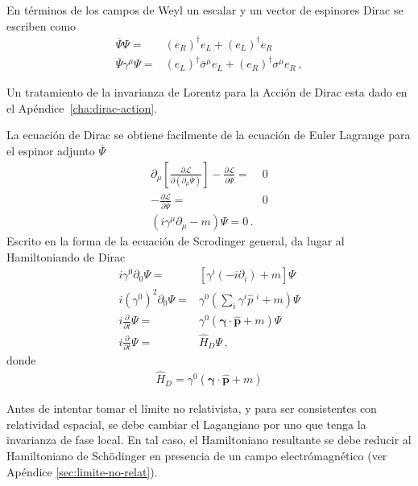En términos de los campos de Weyl un escalar y un vector de espinores Dirac se escriben como
\begin{align}
\label{eq:mwd}
  \overline{\Psi}\Psi =& \left( e_R \right)^\dagger e_L+\left( e_L \right)^{\dagger}e_R \nonumber\\
  \overline{\Psi}\gamma^{\mu}\Psi=& (e_L)^{\dagger}\overline{\sigma}^{\mu}e_L+(e_R)^{\dagger}\sigma^{\mu}e_{R}\,,
\end{align}


Un tratamiento de la invarianza de Lorentz para la Acción de Dirac esta dado en el Apéndice~\ref{cha:dirac-action}. 

\begin{frame}
La ecuación de Dirac se obtiene facilmente de la ecuación de Euler Lagrange para el espinor adjunto $\overline{\Psi}$
\begin{align}
  \partial_{\mu}\left[ \frac{\partial\mathcal{L}}{\partial \left( \partial_{\mu} \overline{\Psi} \right)} \right]-\frac{\partial \mathcal{L}}{\partial \overline{\Psi}}=&0 \nonumber\\
-\frac{\partial \mathcal{L}}{\partial \overline{\Psi}}=&0 \nonumber\\
\left( i\gamma^{\mu}\partial_{\mu}-m \right)\Psi=0\,.
\end{align}
Escrito en la forma de la ecuación de Scrodinger general, da lugar al Hamiltoniando de Dirac
\begin{align}
  i\gamma^0 \partial_{0}\Psi=&\left[ \gamma^{i} \left( -i \partial_{i}\right)+m \right]\Psi \nonumber\\
  i \left( \gamma^0 \right)^2 \partial_{0}\Psi=&\gamma^0\left( \sum_i\gamma^{i} \widehat{p}\;^i +m \right)\Psi \nonumber\\
  i \frac{\partial}{\partial t}\Psi=&\gamma^0\left( \boldsymbol{\gamma}\cdot \widehat{\boldsymbol{p}} +m \right)\Psi \nonumber\\
  i \frac{\partial}{\partial t}\Psi=&\widehat{H}_D\Psi\,,
\end{align}
donde
\begin{align}
  \widehat{H}_D=\gamma^0\left( \boldsymbol{\gamma}\cdot \widehat{\boldsymbol{p}} +m \right)
\end{align}
\end{frame}
Antes de intentar tomar el límite no relativista, y para ser consistentes con relatividad espacial, se debe cambiar el Lagangiano por uno que tenga la invarianza de fase local. En tal caso, el Hamiltoniano resultante se debe reducir al Hamiltoniano de  Sch\"odinger en presencia de un campo electrómagnético (ver Apéndice \ref{sec:limite-no-relat}).

